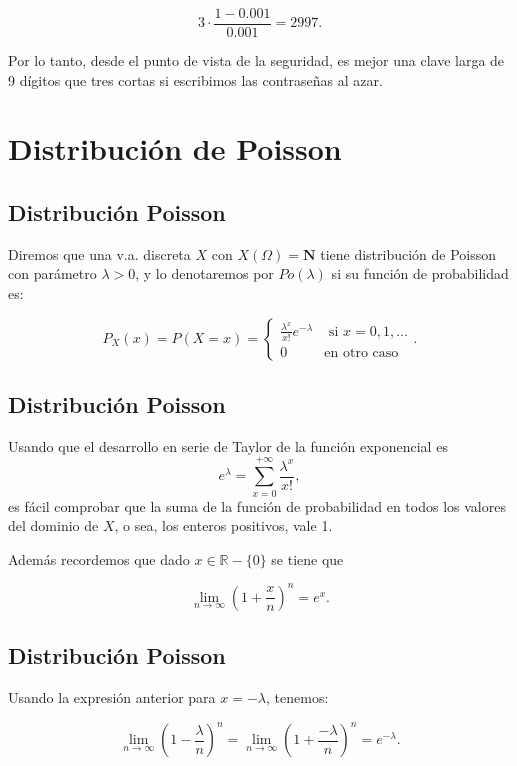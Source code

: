 \documentclass[
  letterpaper,
  DIV=11,
  numbers=noendperiod]{scrreprt}
\begin{document}
\[3\cdot \frac{1-0.001}{0.001}=2997.\]

Por lo tanto, desde el punto de vista de la seguridad, es mejor una
clave larga de 9 dígitos que tres cortas si escribimos las contraseñas
al azar.

\chapter{Distribución de Poisson}\label{distribuciuxf3n-de-poisson}

\section{Distribución Poisson}\label{distribuciuxf3n-poisson}

Diremos que una v.a. discreta \(X\) con \(X(\Omega)=\mathbf{N}\) tiene
distribución de Poisson con parámetro \(\lambda>0\), y lo denotaremos
por \(Po(\lambda)\) si su función de probabilidad es:

\[
P_{X}(x)=P(X=x)=
\left\{\begin{array}{ll}
\frac{\lambda^x}{x!} e^{-\lambda}& \mbox{ si } x=0,1,\ldots\\
0 & \mbox{en otro caso}\end{array}\right..
\]

\section{Distribución Poisson}\label{distribuciuxf3n-poisson-1}

Usando que el desarrollo en serie de Taylor de la función exponencial es
\[
e^{\lambda}=\sum_{x=0}^{+\infty} \frac{\lambda^x}{x!},
\] es fácil comprobar que la suma de la función de probabilidad en todos
los valores del dominio de \(X\), o sea, los enteros positivos, vale 1.

Además recordemos que dado \(x\in\mathbb{R}-\{0\}\) se tiene que

\[
\lim_{n\to\infty} \left(1+\frac{x}{n}\right)^n=e^x.
\]

\section{Distribución Poisson}\label{distribuciuxf3n-poisson-2}

Usando la expresión anterior para \(x=-\lambda\), tenemos:

\[
\lim_{n\to\infty} \left(1-\frac{\lambda}{n}\right)^n=\lim_{n\to\infty} \left(1+\frac{-\lambda}{n}\right)^n=e^{-\lambda}.
\]
\end{document}
